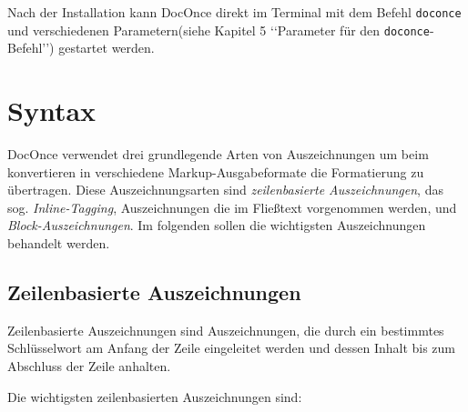 \documentclass[%
oneside,                 %
final,                   %
chapterprefix=true,      %
open=right,              %
10pt]{book}
\begin{document}
Nach der Installation kann DocOnce direkt im Terminal mit dem Befehl \texttt{doconce} und verschiedenen Parametern(siehe Kapitel 5 ‘‘Parameter für den \texttt{doconce}-Befehl’’) gestartet werden.
\chapter{Syntax}
DocOnce verwendet drei grundlegende Arten von Auszeichnungen um beim konvertieren in verschiedene Markup-Ausgabeformate die Formatierung zu übertragen. Diese Auszeichnungsarten sind  \emph{zeilenbasierte Auszeichnungen}, das sog. \emph{Inline-Tagging}, Auszeichnungen die im Fließtext vorgenommen werden, und \emph{Block-Auszeichnungen}. Im folgenden sollen die wichtigsten Auszeichnungen behandelt werden.

\section{Zeilenbasierte Auszeichnungen}
Zeilenbasierte Auszeichnungen sind Auszeichnungen, die durch ein bestimmtes Schlüsselwort am Anfang der Zeile eingeleitet werden und dessen Inhalt bis zum Abschluss der Zeile anhalten.

Die wichtigsten zeilenbasierten Auszeichnungen sind:
\end{document}
